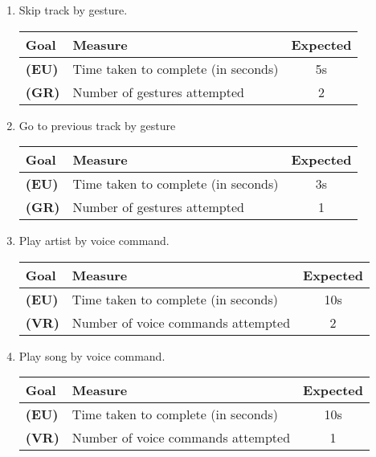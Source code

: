 \documentclass[12pt,letterpaper]{article}
\begin{document}
\begin{enumerate}
\item Skip track by gesture.
\begin{center}\begin{tabular}{l|l|c}
\textbf{Goal} & \textbf{Measure} & \textbf{Expected} \\
\hline
\textbf{(EU)} & Time taken to complete (in seconds) & 5s \\
\hline
\textbf{(GR)} & Number of gestures attempted & 2 \\
\hline
\end{tabular}\end{center}

\item Go to previous track by gesture
\begin{center}\begin{tabular}{l|l|c}
\textbf{Goal} & \textbf{Measure} & \textbf{Expected} \\
\hline
\textbf{(EU)} & Time taken to complete (in seconds) & 3s \\
\hline
\textbf{(GR)} & Number of gestures attempted & 1 \\
\hline
\end{tabular}\end{center}

\item Play artist by voice command.
\begin{center}\begin{tabular}{l|l|c}
\textbf{Goal} & \textbf{Measure} & \textbf{Expected} \\
\hline
\textbf{(EU)} & Time taken to complete (in seconds) & 10s \\
\hline
\textbf{(VR)} & Number of voice commands attempted & 2 \\
\hline
\end{tabular}\end{center}

\item Play song by voice command.
\begin{center}\begin{tabular}{l|l|c}
\textbf{Goal} & \textbf{Measure} & \textbf{Expected} \\
\hline
\textbf{(EU)} & Time taken to complete (in seconds) & 10s \\
\hline
\textbf{(VR)} & Number of voice commands attempted & 1 \\
\hline
\end{tabular}\end{center}


\end{enumerate}
\end{document}
